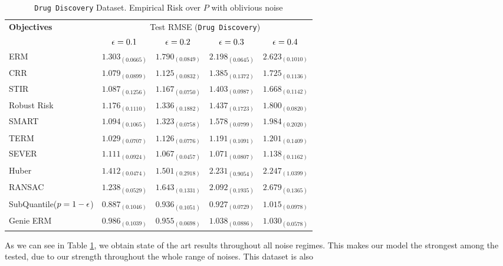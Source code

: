 \documentclass{article} %
\newcommand{\subhead}[1]{\multicolumn{1}{c}{#1}}%
\begin{document}
	\begin{table}[!h]
		\centering
		\begin{tabular}{lcccc}
			\toprule 
			\textbf{Objectives}&\multicolumn{4}{c}{Test RMSE (\texttt{Drug Discovery})}\\                   
			\cmidrule(rl){2-5}
			&\subhead{${\epsilon} = 0.1$}& \subhead{${\epsilon} = 0.2$}& \subhead{${\epsilon} = 0.3$}& \subhead{${\epsilon} = 0.4$}\\ 
			\midrule
			ERM  &$1.303_{(0.0665)}$&$1.790_{(0.0849)}$&$2.198_{(0.0645)}$&$2.623_{(0.1010)}$\\
			CRR \cite{bhatia2017}  &$1.079_{(0.0899)}$&$1.125_{(0.0832)}$&$1.385_{(0.1372)}$&$1.725_{(0.1136)}$\\
			STIR \cite{pmlr-v89-mukhoty19a} &$1.087_{(0.1256)}$&$1.167_{(0.0750)}$&$1.403_{(0.0987)}$&$1.668_{(0.1142)}$\\
			Robust Risk \cite{RRM} &$1.176_{(0.1110)}
			$&$1.336_{(0.1882)}$&$1.437_{(0.1723)}$&$1.800_{(0.0820)}$\\
			SMART \cite{https://doi.org/10.48550/arxiv.2206.04777} &$1.094_{(0.1065)}$&$1.323_{(0.0758)}$&$1.578_{(0.0799)}$&$1.984_{(0.2020)}$\\
			TERM \cite{li2020tilted} &$\mathbf{1.029_{(0.0707)}}$&$1.126_{(0.0776)}$&$1.191_{(0.1091)}$&$1.201_{(0.1409)}$\\
			SEVER \cite{DiakonikolasKKLSS19} &$1.111_{(0.0924)}$&$\mathbf{1.067_{(0.0457)}}$&$\mathbf{1.071_{(0.0807)}}$&$\mathbf{1.138_{(0.1162)}}$\\
			Huber \cite{Huber2009} &$1.412_{(0.0474)}$&$1.501_{(0.2918)}$&$2.231_{(0.9054)}$&$2.247_{(1.0399)}$\\
			RANSAC \cite{RANSAC1981} &$1.238_{(0.0529)}$&$1.643_{(0.1331)}$&$2.092_{(0.1935)}$&$2.679_{(0.1365)}$\\
			\rowcolor{LightCyan}
			SubQuantile($p = 1-{\epsilon}$) &$\mathbf{0.887_{(0.1046)}}$&$\mathbf{0.936_{(0.1051)}}$&$\mathbf{0.927_{(0.0729)}}$&$\mathbf{1.015_{(0.0978)}}$\\
			\midrule 
			Genie ERM &$0.986_{(0.1039)}$&$0.955_{(0.0698)}$&$1.038_{(0.0886)}$&$1.030_{(0.0578)}$\\
			\bottomrule
		\end{tabular}
		\caption{\texttt{Drug Discovery} Dataset. Empirical Risk over $P$ with oblivious noise}
		\label{tab:drug-discovery}
	\end{table}
	
	As we can see in Table \ref{tab:drug-discovery}, we obtain state of the art results throughout all noise regimes. This makes our model the strongest among the tested, due to our strength throughout the whole range of noises. This dataset is also 
	
\end{document}
